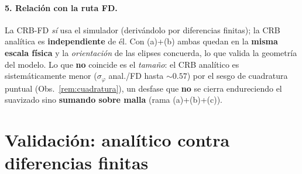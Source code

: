 \documentclass[11pt,a4paper]{article}
\theoremstyle{plain}
\theoremstyle{definition}
\begin{document}
\paragraph{5. Relaci\'on con la ruta FD.} La CRB-FD \emph{s\'i} usa el simulador
(deriv\'andolo por diferencias finitas); la CRB anal\'itica es \textbf{independiente}
de \'el. Con (a)+(b) ambas quedan en la \textbf{misma escala f\'isica} y la
\emph{orientaci\'on} de las elipses concuerda, lo que valida la geometr\'ia del
modelo. Lo que \textbf{no} coincide es el \emph{tama\~no}: el CRB anal\'itico es
sistem\'aticamente menor ($\sigma_\varphi$ anal./FD hasta $\sim0.57$) por el sesgo
de cuadratura puntual (Obs.~\ref{rem:cuadratura}), un desfase que \textbf{no} se
cierra endureciendo el suavizado sino \textbf{sumando sobre malla} (rama
(a)+(b)+(c)).

\section{Validaci\'on: anal\'itico contra diferencias finitas}
\label{sec:validacion}
\end{document}
